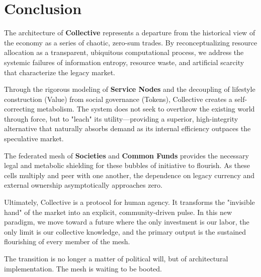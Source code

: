 \section{Conclusion}

The architecture of \textbf{Collective} represents a departure from the historical view of the economy as a series of chaotic, zero-sum trades. By reconceptualizing resource allocation as a transparent, ubiquitous computational process, we address the systemic failures of information entropy, resource waste, and artificial scarcity that characterize the legacy market. 

Through the rigorous modeling of \textbf{Service Nodes} and the decoupling of lifestyle construction (Value) from social governance (Tokens), Collective creates a self-correcting metabolism. The system does not seek to overthrow the existing world through force, but to "leach" its utility—providing a superior, high-integrity alternative that naturally absorbs demand as its internal efficiency outpaces the speculative market.

The federated mesh of \textbf{Societies} and \textbf{Common Funds} provides the necessary legal and metabolic shielding for these bubbles of initiative to flourish. As these cells multiply and peer with one another, the dependence on legacy currency and external ownership asymptotically approaches zero. 

Ultimately, Collective is a protocol for human agency. It transforms the "invisible hand" of the market into an explicit, community-driven pulse. In this new paradigm, we move toward a future where the only investment is our labor, the only limit is our collective knowledge, and the primary output is the sustained flourishing of every member of the mesh. 

The transition is no longer a matter of political will, but of architectural implementation. The mesh is waiting to be booted.
